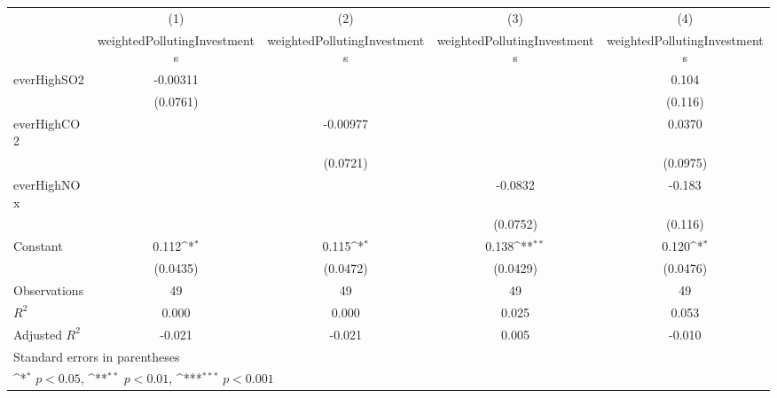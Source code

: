 {
\def\sym#1{\ifmmode^{#1}\else\(^{#1}\)\fi}
\begin{tabular}{l*{4}{c}}
\toprule
                    &\multicolumn{1}{c}{(1)}&\multicolumn{1}{c}{(2)}&\multicolumn{1}{c}{(3)}&\multicolumn{1}{c}{(4)}\\
                    &\multicolumn{1}{c}{weightedPollutingInvestments}&\multicolumn{1}{c}{weightedPollutingInvestments}&\multicolumn{1}{c}{weightedPollutingInvestments}&\multicolumn{1}{c}{weightedPollutingInvestments}\\
\midrule
everHighSO2         &    -0.00311         &                     &                     &       0.104         \\
                    &    (0.0761)         &                     &                     &     (0.116)         \\
\addlinespace
everHighCO2         &                     &    -0.00977         &                     &      0.0370         \\
                    &                     &    (0.0721)         &                     &    (0.0975)         \\
\addlinespace
everHighNOx         &                     &                     &     -0.0832         &      -0.183         \\
                    &                     &                     &    (0.0752)         &     (0.116)         \\
\addlinespace
Constant            &       0.112\sym{*}  &       0.115\sym{*}  &       0.138\sym{**} &       0.120\sym{*}  \\
                    &    (0.0435)         &    (0.0472)         &    (0.0429)         &    (0.0476)         \\
\midrule
Observations        &          49         &          49         &          49         &          49         \\
\(R^{2}\)           &       0.000         &       0.000         &       0.025         &       0.053         \\
Adjusted \(R^{2}\)  &      -0.021         &      -0.021         &       0.005         &      -0.010         \\
\bottomrule
\multicolumn{5}{l}{\footnotesize Standard errors in parentheses}\\
\multicolumn{5}{l}{\footnotesize \sym{*} \(p<0.05\), \sym{**} \(p<0.01\), \sym{***} \(p<0.001\)}\\
\end{tabular}
}

